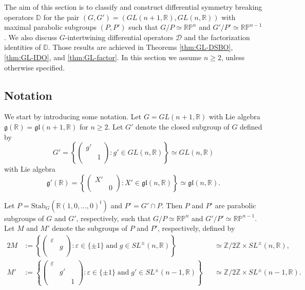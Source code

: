 \documentclass[reqno,11pt]{amsart}
\theoremstyle{remark}
\theoremstyle{definition}
\numberwithin{equation}{section}
\newcommand{\eps}{\varepsilon}
\newcommand{\fg}{{\mathfrak g}}
\newcommand{\f}{\mathfrak}
\newcommand{\R}{\mathbb{R}}
\newcommand{\Z}{\mathbb{Z}}
\newcommand{\Cal}{\mathcal}
\newcommand{\RP}{\mathbb{R}\mathbb{P}}
\newcommand{\D}{\Cal{D}}
\newcommand{\bD}{\mathbb{D}}
\begin{document}
The aim of this section is to classify and construct differential symmetry breaking operators $\bD$ for the pair $(G, G') = (GL(n+1,\R), GL(n,\R))$ with
maximal parabolic subgroups $(P, P')$ such that $G/P \simeq \RP^n$ and $G'/P' \simeq \RP^{n-1}$. We also discuss $G$-intertwining differential operators $\D$ 
and the factorization identities of $\bD$. Those results are achieved in Theorems
\ref{thm:GL-DSBO}, \ref{thm:GL-IDO}, and \ref{thm:GL-factor}. 
In this section we assume $n\geq 2$, unless otherwise specified.


\subsection{
Notation
}
\label{sec:notation2}
We start by introducing some notation. 
Let $G=GL(n+1,\R)$ with Lie algebra $\fg(\R)=\f{gl}(n+1,\R)$
for $n \geq 2$. Let $G'$ denote the closed subgroup of $G$ defined by
\begin{equation*}
G'=
\left\{
\begin{pmatrix}
g'&\\
& 1\\
\end{pmatrix}
:
g' \in GL(n,\R)
\right\}\simeq GL(n,\R)
\end{equation*}
with Lie algebra
\begin{equation*}
\fg'(\R)= \left\{
\begin{pmatrix}
X' & \\
 & 0
\end{pmatrix}
:
X' \in \f{gl}(n,\R)
\right\}\simeq \f{gl}(n,\R).
\end{equation*}

Let $P = \text{Stab}_{G}(\R(1,0,\ldots,0)^t)$ and $P'=G' \cap P$. Then $P$ and $P'$ are 
parabolic subgroups of $G$ and $G'$, respectively, such that 
$G/P \simeq \RP^n$ and $G'/P' \simeq \RP^{n-1}$.
Let  $M$ and $M'$ denote the subgroups of $P$ and $P'$, respectively, 
defined by
\begin{alignat*}{2}
M&:= 
\left\{
\begin{pmatrix}
\eps &\\
& g\\
\end{pmatrix}
:
\eps \in \{\pm 1\}
\;
\text{and}
\;
g \in SL^{\pm}(n,\R)
\right\}
&&\simeq \Z/2\Z \times SL^{\pm}(n,\R),\\
M'&:= 
\left\{
\begin{pmatrix}
\eps & & \\
& g' &\\
&&1
\end{pmatrix}
:
\eps \in \{\pm 1\}
\;
\text{and}
\;
g' \in SL^{\pm}(n-1,\R)
\right\}
&&\simeq \Z/2\Z \times SL^{\pm}(n-1,\R).
\end{alignat*}
\end{document}
